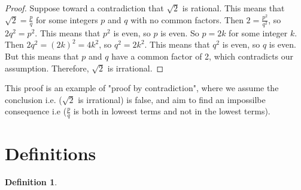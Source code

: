 \documentclass{article}
\newtheorem{definition}{Definition}
\begin{document}
  \begin{proof}
    Suppose toward a contradiction that $\sqrt2$ is rational. This means that $\sqrt2 = \frac{p}{q}$
    for some integers $p$ and $q$ with no common factors. Then $2 = \frac{p^2}{q^2}$, so $2q^2 = p^2$.
    This means that $p^2$ is even, so $p$ is even. So $p = 2k$ for some integer $k$. Then $2q^2 = (2k)^2 = 4k^2$,
    so $q^2 = 2k^2$. This means that $q^2$ is even, so $q$ is even. But this means that $p$ and $q$ have a common
    factor of 2, which contradicts our assumption. Therefore, $\sqrt2$ is irrational.
\end{proof}

    This proof is an example of "proof by contradiction", where we assume the conclusion i.e. ($\sqrt{2}$ is irrational) is false,
    and aim to find an impossilbe consequence  i.e ($\frac{p}{q}$ is both in loweest terms and not in the lowest terms).



\section{Definitions}

\begin{definition}
\end{definition}

\end{document}
